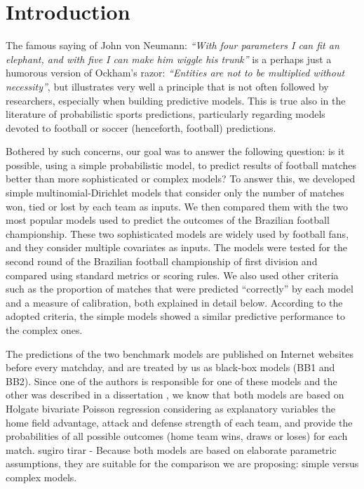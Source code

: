 \documentclass[journal,article,accept,moreauthors,pdftex,12pt,a4paper]{mdpi}
\begin{document}
	
	
	\section{Introduction}
	
	The famous saying of John von Neumann: {\it ``With four parameters I can fit an elephant, and with five I can make him wiggle his trunk''} is a perhaps just a humorous version of Ockham's razor:
	{\it``Entities are not to be multiplied without necessity''}, but illustrates very well a principle that is not often followed by researchers, especially when building predictive models.
	This is true also in the literature of probabilistic sports predictions, particularly regarding models devoted to football or soccer (henceforth, football) predictions.
	
	Bothered by such concerns, our goal was to answer the following question: is it possible, using a simple probabilistic model, to predict results of football matches better than more sophisticated or complex models?
	{\color{blue}To answer this, we developed simple multinomial-Dirichlet models that consider only the number of matches won, tied or lost by each team as inputs. We then compared them with the two most popular 
	 models used to predict the outcomes of the Brazilian football championship. These two sophisticated models are widely used by football fans, and  they consider multiple covariates as inputs.}
	The models were tested for the second round of the Brazilian football championship of first division and compared using standard metrics or scoring rules. 
	We also used other criteria such as the proportion of matches that were predicted ``correctly'' by each model and a measure of calibration, both explained in detail below.
	According to the adopted criteria, the simple models showed a similar predictive performance to the complex ones.
	
	The predictions of the two benchmark models are published on Internet websites before every matchday, and are treated by us as black-box models (BB1 and BB2).
	Since one of the authors is responsible for one of these models and the other was described in a dissertation \citep{arruda2000}, we know that both models are based on Holgate bivariate Poisson regression considering as explanatory variables the home field advantage, attack and defense strength of each team, and provide the probabilities of all possible outcomes (home team wins, draws or loses) for each match.
{\color{red}sugiro tirar - Because both models are based on elaborate parametric assumptions, they are suitable for the comparison we are proposing: simple versus complex models. 
	}	
	
\end{document}
